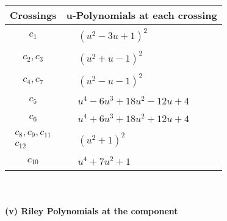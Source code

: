 \documentclass[1p]{elsarticle_modified}
\theoremstyle{definition}
\begin{document}
\begin{tabular}{m{50pt}|m{274pt}}
Crossings & \hspace{64pt}u-Polynomials at each crossing \\
\hline $$\begin{aligned}c_{1}\end{aligned}$$&$\begin{aligned}
&(u^2-3 u+1)^2
\end{aligned}$\\
\hline $$\begin{aligned}c_{2},c_{3}\end{aligned}$$&$\begin{aligned}
&(u^2+u-1)^2
\end{aligned}$\\
\hline $$\begin{aligned}c_{4},c_{7}\end{aligned}$$&$\begin{aligned}
&(u^2- u-1)^2
\end{aligned}$\\
\hline $$\begin{aligned}c_{5}\end{aligned}$$&$\begin{aligned}
&u^4-6 u^3+18 u^2-12 u+4
\end{aligned}$\\
\hline $$\begin{aligned}c_{6}\end{aligned}$$&$\begin{aligned}
&u^4+6 u^3+18 u^2+12 u+4
\end{aligned}$\\
\hline $$\begin{aligned}c_{8},c_{9},c_{11}\\c_{12}\end{aligned}$$&$\begin{aligned}
&(u^2+1)^2
\end{aligned}$\\
\hline $$\begin{aligned}c_{10}\end{aligned}$$&$\begin{aligned}
&u^4+7 u^2+1
\end{aligned}$\\
\hline
\end{tabular}\\~\\
\newpage\renewcommand{\arraystretch}{1}
\flushleft \textbf{(v) Riley Polynomials at the component}\newline \\
\end{document}
